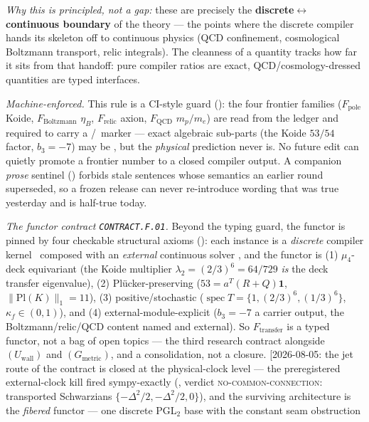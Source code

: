 \begin{gapbox}
\smallskip
\noindent\emph{Why this is principled, not a gap:} these are precisely the \textbf{discrete$\leftrightarrow$
continuous boundary} of the theory --- the points where the discrete compiler hands its skeleton off to
continuous physics (QCD confinement, cosmological Boltzmann transport, relic integrals). The cleanness of a
quantity tracks how far it sits from that handoff: pure compiler ratios are exact, QCD/cosmology-dressed
quantities are typed interfaces. 
\par\smallskip\noindent\emph{Machine-enforced.} This rule is a CI-style guard
(): the four frontier families
($F_{\mathrm{pole}}$ Koide, $F_{\mathrm{Boltzmann}}$ $\eta_B$, $F_{\mathrm{relic}}$ axion,
$F_{\mathrm{QCD}}$ $m_p/m_e$) are read from the ledger and required to carry a \mC/\mO\ marker --- exact
algebraic sub-parts (the Koide $53/54$ factor, $b_3=-7$) may be \mE, but the \emph{physical} prediction
never is. No future edit can quietly promote a frontier number to a closed compiler output. A companion
\emph{prose} sentinel () forbids stale sentences whose semantics an
earlier round superseded, so a frozen release can never re-introduce wording that was true yesterday and is
half-true today.
\par\smallskip\noindent\emph{The functor contract \texttt{CONTRACT.F.01}.} Beyond the typing guard, the
functor is pinned by four checkable structural axioms (): each instance is a
\emph{discrete} compiler kernel \mE\ composed with an \emph{external} continuous solver \mC, and the functor
is (1) $\mu_4$-deck equivariant (the Koide multiplier $\lambda_2=(2/3)^6=64/729$ \emph{is} the deck transfer
eigenvalue), (2) Pl\"ucker-preserving ($53=a^T(R{+}Q)\mathbf1$, $\|\mathrm{Pl}(K)\|_1=11$), (3)
positive/stochastic ($\operatorname{spec}T=\{1,(2/3)^6,(1/3)^6\}$, $\kappa_f\in(0,1)$), and (4)
external-module-explicit ($b_3=-7$ a carrier output, the Boltzmann/relic/QCD content named and external). So
$F_{\mathrm{transfer}}$ is a typed functor, not a bag of open topics --- the third research contract alongside
$(U_{\mathrm{wall}})$ and $(G_{\mathrm{metric}})$, and a consolidation, not a closure.
[2026-08-05: the jet route of the contract is closed at the physical-clock level --- the preregistered
external-clock kill fired sympy-exactly (, verdict
\textsc{no-common-connection}: transported Schwarzians $\{-\Delta^2/2,-\Delta^2/2,0\}$), and the surviving
architecture is the \emph{fibered} functor --- one discrete PGL$_2$ base with the constant seam obstruction

\end{gapbox}
